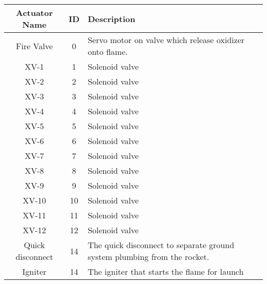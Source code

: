 \begin{table}
    \centering
    \begin{tabular}{| c | c | p{3in} |}
        \hline
        Actuator Name    & ID & Description                                                              \\
        \hline
        Fire Valve       & 0  & Servo motor on valve which release oxidizer onto flame.                  \\
        \hline
        XV-1             & 1  & Solenoid valve                                                           \\
        \hline
        XV-2             & 2  & Solenoid valve                                                           \\
        \hline
        XV-3             & 3  & Solenoid valve                                                           \\
        \hline
        XV-4             & 4  & Solenoid valve                                                           \\
        \hline
        XV-5             & 5  & Solenoid valve                                                           \\
        \hline
        XV-6             & 6  & Solenoid valve                                                           \\
        \hline
        XV-7             & 7  & Solenoid valve                                                           \\
        \hline
        XV-8             & 8  & Solenoid valve                                                           \\
        \hline
        XV-9             & 9  & Solenoid valve                                                           \\
        \hline
        XV-10            & 10 & Solenoid valve                                                           \\
        \hline
        XV-11            & 11 & Solenoid valve                                                           \\
        \hline
        XV-12            & 12 & Solenoid valve                                                           \\
        \hline
        Quick disconnect & 14 & The quick disconnect to separate ground system plumbing from the rocket. \\
        \hline
        Igniter          & 14 & The igniter that starts the flame for launch                             \\
        \hline
    \end{tabular}
\end{table}

